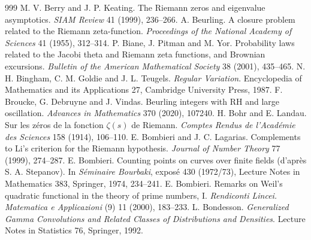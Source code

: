 \begin{thebibliography}{999}
 M. V. Berry and J. P. Keating. The Riemann zeros and eigenvalue asymptotics. \emph{SIAM Review} 41 (1999), 236--266.
 A. Beurling. A closure problem related to the Riemann zeta-function. \emph{Proceedings of the National Academy of Sciences} 41 (1955), 312--314.
 P. Biane, J. Pitman and M. Yor. Probability laws related to the Jacobi theta and Riemann zeta functions, and Brownian excursions. \emph{Bulletin of the American Mathematical Society} 38 (2001), 435--465.
 N. H. Bingham, C. M. Goldie and J. L. Teugels. \emph{Regular Variation}. Encyclopedia of Mathematics and its Applications 27, Cambridge University Press, 1987.
 F. Broucke, G. Debruyne and J. Vindas. Beurling integers with RH and large oscillation. \emph{Advances in Mathematics} 370 (2020), 107240.
 H. Bohr and E. Landau. Sur les z\'eros de la fonction $\zeta(s)$ de Riemann. \emph{Comptes Rendus de l'Acad\'emie des Sciences} 158 (1914), 106--110.
 E. Bombieri and J. C. Lagarias. Complements to Li's criterion for the Riemann hypothesis. \emph{Journal of Number Theory} 77 (1999), 274--287.
 E. Bombieri. Counting points on curves over finite fields (d'apr\`es S. A. Stepanov). In \emph{S\'eminaire Bourbaki}, expos\'e 430 (1972/73), Lecture Notes in Mathematics 383, Springer, 1974, 234--241. %
 E. Bombieri. Remarks on Weil's quadratic functional in the theory of prime numbers, I. \emph{Rendiconti Lincei. Matematica e Applicazioni} (9) 11 (2000), 183--233.
 L. Bondesson. \emph{Generalized Gamma Convolutions and Related Classes of Distributions and Densities}. Lecture Notes in Statistics 76, Springer, 1992.

\end{thebibliography}
